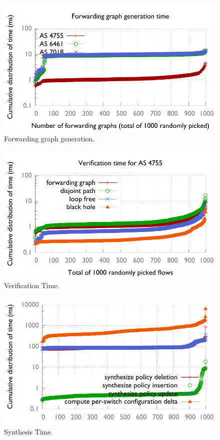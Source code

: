 \begin{figure}
  \centering
  \includegraphics[width=1\linewidth]{figures/fg_cdf1000.pdf}
  \caption{Forwarding graph generation.}
  \label{fig:init}
\end{figure}

\begin{figure}
  \centering
  \includegraphics[width=1\linewidth]{figures/verify_cdf1000.pdf}
  \caption{Verification Time.}
  \label{fig:init}
\end{figure}

\begin{figure}
  \centering
  \includegraphics[width=1\linewidth]{figures/vn_synthesis_cdf1000.pdf}
  \caption{Synthesis Time.}
  \label{fig:init}
\end{figure}

